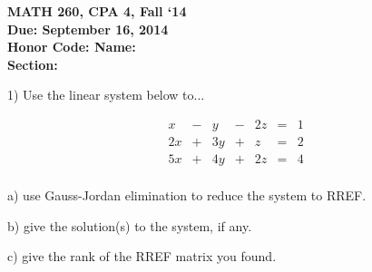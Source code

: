 \documentclass{article}
\begin{document}
\begin{flushleft}
	\bfseries{MATH 260, CPA 4, Fall `14}\\
	\bfseries{Due: September 16, 2014}\\
	\bfseries{Honor Code:} \hspace{3.5in}\bfseries{Name:}\\
	\hspace{4.37in}\bfseries{Section:}
\end{flushleft}
\begin{flushleft}
\vspace{.25in}

1) Use the linear system below to...

\begin{center}
\begin{equation*}
\begin{array}{ccccccr}
 x & - &  y & - & 2z & = & 1\\
2x & + & 3y & + &  z & = & 2\\
5x & + & 4y & + & 2z & = & 4\\
\end{array}
\end{equation*}
\end{center}

a) use Gauss-Jordan elimination to reduce the system to RREF.

\vspace{5in}

b) give the solution(s) to the system, if any.

\vspace{1in}

c) give the rank of the RREF matrix you found.

\end{flushleft}
\end{document}
